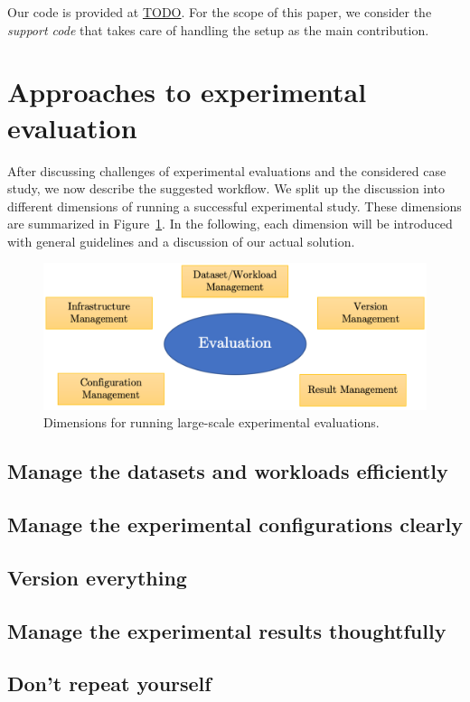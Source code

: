 \documentclass{llncs}
\begin{document}
Our code is provided at \url{TODO}. For the scope of this paper, we consider the \emph{support code} that takes care of handling the setup as the main contribution.  

\section{Approaches to experimental evaluation}
After discussing challenges of experimental evaluations and the considered case study, 
we now describe the suggested workflow. 
We split up the discussion into different dimensions of running a successful experimental study. These dimensions are summarized in Figure~\ref{fig:discussion}. 
In the following, each dimension will be introduced with general guidelines and a discussion of our actual solution. 

\begin{figure}
  \includegraphics[width=\textwidth]{figs/discussion_points.png}
  \caption{Dimensions for running large-scale experimental evaluations.}
  \label{fig:discussion}
\end{figure}
\subsection{Manage the datasets and workloads efficiently}
\subsection{Manage the experimental configurations clearly}
\subsection{Version everything}
\subsection{Manage the experimental results thoughtfully}
\subsection{Don't repeat yourself}
\end{document}
